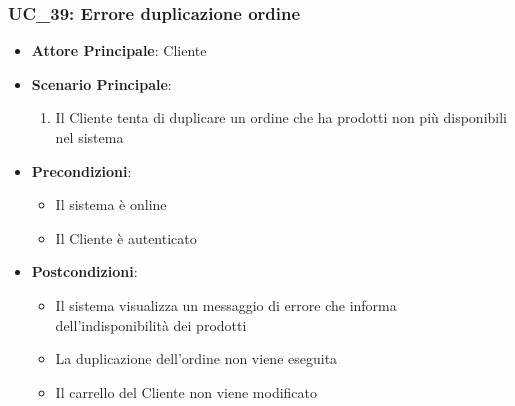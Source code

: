 \subsubsection{UC\_39: Errore duplicazione ordine}
\label{uc_39}

\begin{itemize}
    \item \textbf{Attore Principale}: Cliente
	 \item \textbf{Scenario Principale}:
	 \begin{enumerate}
		\item Il Cliente tenta di duplicare un ordine che ha prodotti non più disponibili nel sistema
	 \end{enumerate}
	\item \textbf{Precondizioni}:
	\begin{itemize}
		\item Il sistema è online
		\item Il Cliente è autenticato
	\end{itemize}
	\item \textbf{Postcondizioni}:
	\begin{itemize}
		\item Il sistema visualizza un messaggio di errore che informa dell'indisponibilità dei prodotti
		\item La duplicazione dell'ordine non viene eseguita
		\item Il carrello del Cliente non viene modificato
	\end{itemize}
\end{itemize}